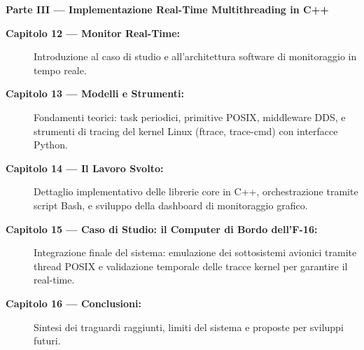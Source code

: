 \noindent\textbf{Parte III — Implementazione Real-Time Multithreading in C++}
\begin{description}
	\item[\textbf{Capitolo 12 — Monitor Real-Time:}]
	Introduzione al caso di studio e all'architettura software di monitoraggio in tempo reale.
	\item[\textbf{Capitolo 13 — Modelli e Strumenti:}]
	Fondamenti teorici: task periodici, primitive POSIX, middleware DDS, e strumenti di tracing del kernel Linux (ftrace, trace-cmd) con interfacce Python.
	\item[\textbf{Capitolo 14 — Il Lavoro Svolto:}]
	Dettaglio implementativo delle librerie core in C++, orchestrazione tramite script Bash, e sviluppo della dashboard di monitoraggio grafico.
	\item[\textbf{Capitolo 15 — Caso di Studio: il Computer di Bordo dell'F-16:}]
	Integrazione finale del sistema: emulazione dei sottosistemi avionici tramite thread POSIX e validazione temporale delle tracce kernel per garantire il real-time.
	\item[\textbf{Capitolo 16 — Conclusioni:}]
	Sintesi dei traguardi raggiunti, limiti del sistema e proposte per sviluppi futuri.
\end{description}
